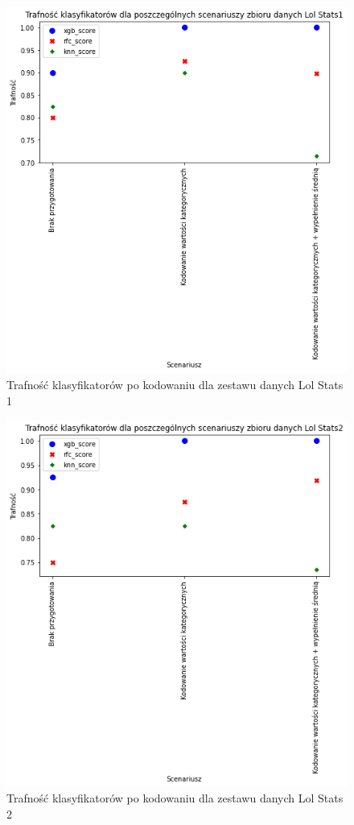 \documentclass{book}
\begin{document}
\begin{figure}[H]
\centerline{\includegraphics{Lol_Stats_1_Kodowanie}}
\centering
\caption{Trafność klasyfikatorów po kodowaniu dla zestawu danych Lol Stats 1}
\end{figure}

\begin{figure}[H]
\centerline{\includegraphics{Lol_Stats_2_Kodowanie}}
\centering
\caption{Trafność klasyfikatorów po kodowaniu dla zestawu danych Lol Stats 2}
\end{figure}
\end{document}
